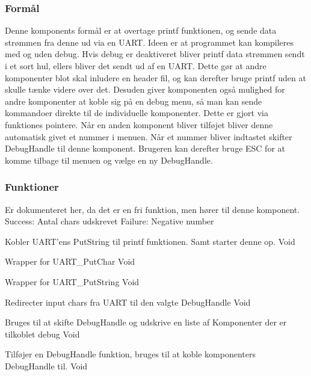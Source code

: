 \subsubsection{Formål}
Denne komponents formål er at overtage 
printf funktionen, og sende data strømmen fra denne ud 
via en UART. Ideen er at programmet kan kompileres med 
og uden debug. Hvis debug er deaktiveret bliver printf 
data strømmen sendt i et sort hul, ellers bliver det 
sendt ud af en UART. Dette gør at andre komponenter 
blot skal inludere en header fil, og kan derefter bruge 
printf uden at skulle tænke videre over det. Desuden giver 
komponenten også mulighed for andre komponenter at koble 
sig på en debug menu, så man kan sende kommandoer direkte 
til de individuelle komponenter. Dette er gjort via 
funktiones pointere. Når en anden komponent bliver tilføjet 
bliver denne automatisk givet et nummer i menuen. Når et 
nummer bliver indtastet skifter DebugHandle til denne 
komponent. Brugeren kan derefter bruge ESC for at komme 
tilbage til menuen og vælge en ny DebugHandle.


\subsubsection{Funktioner}

{Er dokumenteret her, da det er en fri funktion, men hører til denne komponent.}
{Success: Antal chars udskrevet Failure: Negative number}

{Kobler UART'ens PutString til printf funktionen. Samt starter denne op.}
{Void}

{Wrapper for UART\_PutChar}
{Void}

{Wrapper for UART\_PutString}
{Void}

{Redirecter input chars fra UART til den valgte DebugHandle}
{Void}

{Bruges til at skifte DebugHandle og udskrive en liste af Komponenter der er tilkoblet debug}
{Void}

{Tilføjer en DebugHandle funktion, bruges til at koble komponenters DebugHandle til.}
{Void}

